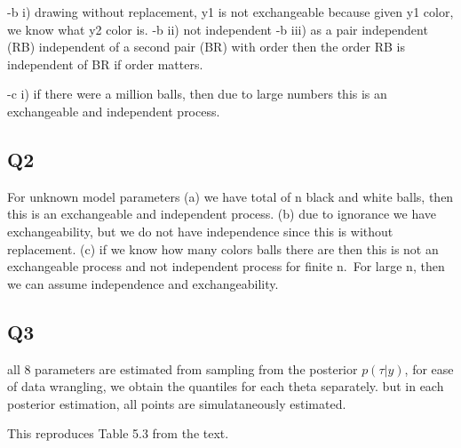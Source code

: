 \documentclass[
]{book}
\theoremstyle{definition}
\theoremstyle{definition}
\theoremstyle{definition}
\theoremstyle{definition}
\theoremstyle{remark}
\begin{document}
-b i) drawing without replacement, y1 is not exchangeable because given y1 color, we know what y2 color is.
-b ii) not independent
-b iii) as a pair independent (RB) independent of a second pair (BR) with order then the order RB is independent of BR if order matters.

-c i) if there were a million balls, then due to large numbers this is an exchangeable and independent process.

\hypertarget{q2}{%
\subsection*{Q2}\label{q2}}

For unknown model parameters (a) we have total of n black and white balls, then this is an exchangeable and independent process. (b) due to ignorance we have exchangeability, but we do not have independence since this is without replacement. (c) if we know how many colors balls there are then this is not an exchangeable process and not independent process for finite n.~For large n, then we can assume independence and exchangeability.

\hypertarget{q3}{%
\subsection*{Q3}\label{q3}}

all 8 parameters are estimated from sampling from the posterior \(p(\tau | y)\), for ease of data wrangling, we obtain the quantiles for each theta separately. but in each posterior estimation, all points are simulataneously estimated.

This reproduces Table 5.3 from the text.
\end{document}
